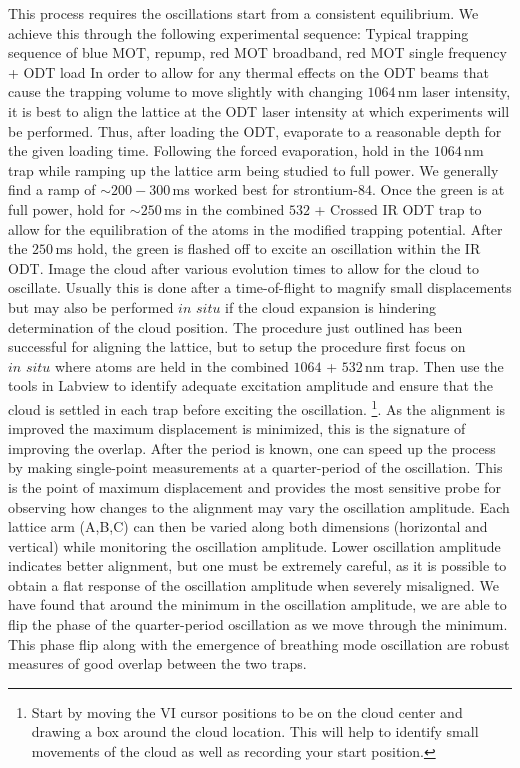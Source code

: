 \begin{outline}[enumerate]
\1 This process requires the oscillations start from a consistent equilibrium.
We achieve this through the following experimental sequence:
	\2 Typical trapping sequence of blue MOT, repump, red MOT broadband, red MOT single frequency + ODT load
	\2 In order to allow for any thermal effects on the ODT beams that cause the trapping volume to move slightly with changing $1064$\,nm laser intensity, it is best to align the lattice at the ODT laser intensity at which experiments will be performed. 
	Thus, after loading the ODT, evaporate to a reasonable depth for the given loading time.
	\2 Following the forced evaporation, hold in the $1064$\,nm trap while ramping up the lattice arm being studied to full power.
	We generally find a ramp of $\sim\!200 - 300$\,ms worked best for strontium-$84$. 
	\2 Once the green is at full power, hold for $\sim\!250$\,ms in the combined $532$ + Crossed IR ODT trap to allow for the equilibration of the atoms in the modified trapping potential.
	\2 After the $250$\,ms hold, the green is flashed off to excite an oscillation within the IR ODT.
	\2 Image the cloud after various evolution times to allow for the cloud to oscillate. 
	Usually this is done after a time-of-flight to magnify small displacements but may also be performed $\textit{in situ}$ if the cloud expansion is hindering determination of the cloud position. 
\1 The procedure just outlined has been successful for aligning the lattice, but to setup the procedure first focus on $\textit{in situ}$ where atoms are held in the combined $1064$ + $532$\,nm trap.
Then use the tools in Labview to identify adequate excitation amplitude and ensure that the cloud is settled in each trap before exciting the oscillation. \footnote{
Start by moving the VI cursor positions to be on the cloud center and drawing a box around the cloud location.
This will help to identify small movements of the cloud as well as recording your start position.}.  
\1 As the alignment is improved the maximum displacement is minimized, this is the signature of improving the overlap.
After the period is known, one can speed up the process by making single-point measurements at a quarter-period of the oscillation.
This is the point of maximum displacement and provides the most sensitive probe for observing how changes to the alignment may vary the oscillation amplitude.
\1 Each lattice arm (A,B,C) can then be varied along both dimensions (horizontal and vertical) while monitoring the oscillation amplitude. 
Lower oscillation amplitude indicates better alignment, but one must be extremely careful, as it is possible to obtain a flat response of the oscillation amplitude when severely misaligned.
We have found that around the minimum in the oscillation amplitude, we are able to flip the phase of the quarter-period oscillation as we move through the minimum.
This phase flip along with the emergence of breathing mode oscillation are robust measures of good overlap between the two traps.
\end{outline}

